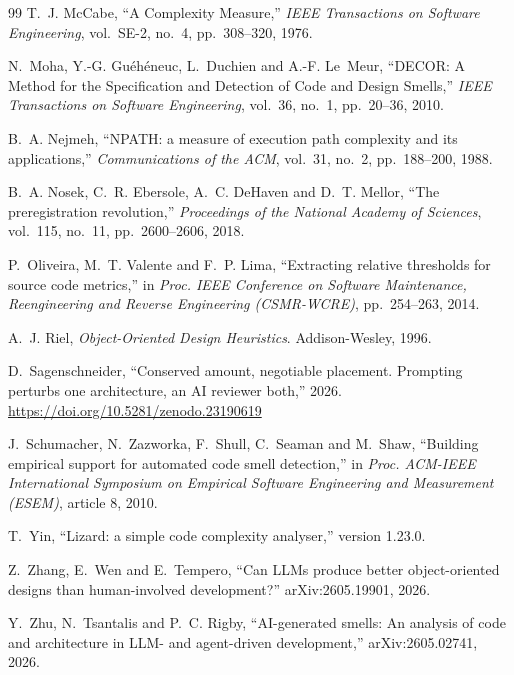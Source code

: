 \documentclass[11pt,a4paper]{article}
\begin{document}
\begin{thebibliography}{99}
 T.~J. McCabe,
  ``A Complexity Measure,''
  \emph{IEEE Transactions on Software Engineering}, vol.~SE-2, no.~4,
  pp.~308--320, 1976.

 N.~Moha, Y.-G. Gu\'eh\'eneuc, L.~Duchien and A.-F. Le~Meur,
  ``DECOR: A Method for the Specification and Detection of Code and Design
  Smells,''
  \emph{IEEE Transactions on Software Engineering}, vol.~36, no.~1, pp.~20--36,
  2010.

 B.~A. Nejmeh,
  ``NPATH: a measure of execution path complexity and its applications,''
  \emph{Communications of the ACM}, vol.~31, no.~2, pp.~188--200, 1988.

 B.~A. Nosek, C.~R. Ebersole, A.~C. DeHaven and D.~T. Mellor,
  ``The preregistration revolution,''
  \emph{Proceedings of the National Academy of Sciences}, vol.~115, no.~11,
  pp.~2600--2606, 2018.

 P.~Oliveira, M.~T. Valente and F.~P. Lima,
  ``Extracting relative thresholds for source code metrics,''
  in \emph{Proc. IEEE Conference on Software Maintenance, Reengineering and
  Reverse Engineering (CSMR-WCRE)}, pp.~254--263, 2014.

 A.~J. Riel,
  \emph{Object-Oriented Design Heuristics}. Addison-Wesley, 1996.

 D.~Sagenschneider,
  ``Conserved amount, negotiable placement. Prompting perturbs one architecture,
  an AI reviewer both,'' 2026. \url{https://doi.org/10.5281/zenodo.23190619}

 J.~Schumacher, N.~Zazworka, F.~Shull, C.~Seaman and
  M.~Shaw,
  ``Building empirical support for automated code smell detection,''
  in \emph{Proc. ACM-IEEE International Symposium on Empirical Software
  Engineering and Measurement (ESEM)}, article 8, 2010.

 T.~Yin,
  ``Lizard: a simple code complexity analyser,'' version 1.23.0.

 Z.~Zhang, E.~Wen and E.~Tempero,
  ``Can LLMs produce better object-oriented designs than human-involved
  development?'' arXiv:2605.19901, 2026.

 Y.~Zhu, N.~Tsantalis and P.~C. Rigby,
  ``AI-generated smells: An analysis of code and architecture in LLM- and
  agent-driven development,'' arXiv:2605.02741, 2026.

\end{thebibliography}
\end{document}
